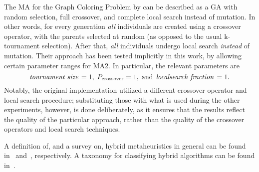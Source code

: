 \documentclass[thesis.tex]{subfiles}
\begin{document}
The \gls{MA} for the Graph Coloring Problem by \textcite{galinier98hybrid} can be described as a \gls{GA} with random selection, full crossover, and complete local search instead of mutation. In other words, for every generation \emph{all} individuals are created using a crossover operator, with the parents selected at random (as opposed to the usual k-tournament selection). After that, \emph{all} individuals undergo local search \emph{instead} of mutation. Their approach has been tested implicitly in this work, by allowing certain parameter ranges for \gls{MA2}. In particular, the relevant parameters are
   \[
      \textit{tournament size}\, = 1,\; P_\mathrm{crossover} = 1,\; \text{and}\;\, \textit{localsearch fraction}\, = 1.
   \]
   Notably, the original implementation utilized a different crossover operator and local search procedure; substituting those with what is used during the other experiments, however, is done deliberately, as it ensures that the results reflect the quality of the particular approach, rather than the quality of the crossover operators and local search techniques.

\smallbreak
A definition of, and a survey on, hybrid metaheuristics in general can be found in~\parencite{sorensen2013metaheuristics} and~\parencite{2008-hybridOverview}, respectively. A taxonomy for classifying hybrid algorithms can be found in~\parencite{jourdan-2009-hybridTaxonomy}.
\end{document}
